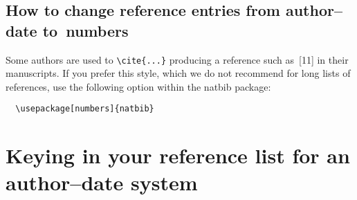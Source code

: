\subsection{How to change reference entries from author--date to~numbers}
\label{numberedbiblio}

Some authors are used to \verb"\cite{...}" producing a
reference such as~[11] in their manuscripts. If you prefer this style, which
we do not recommend for long lists of references,
use the following option within the natbib package:
\begin{verbatim}
  \usepackage[numbers]{natbib}
\end{verbatim}

\section{Keying in your reference list for an author--date system}
\label{authordatebiblio}

